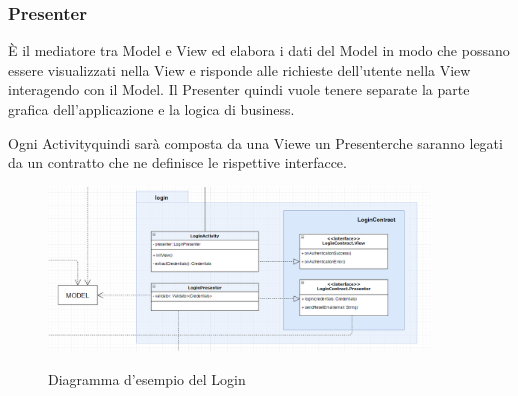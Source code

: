\subsubsection{Presenter}
È il mediatore tra Model e View ed elabora i dati del Model in modo che possano essere visualizzati nella View e risponde alle richieste dell'utente nella
View interagendo con il Model. Il Presenter quindi vuole tenere separate la parte grafica dell'applicazione e la logica di business.

Ogni Activity\glosp quindi sarà composta da una View\glosp e un Presenter\glosp che saranno legati da un contratto che ne definisce le rispettive interfacce.
\begin{figure}[H]
	\centering
	\includegraphics[width=0.9\textwidth]
	{res/images/contratto.png}\\
	\caption{Diagramma d'esempio del Login}
	\label{Schema Login}
\end{figure}
\newpage
